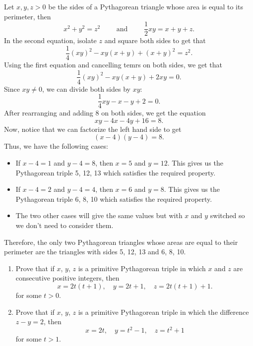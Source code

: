 \begin{solution}
    Let $x,y,z > 0$ be the sides of a Pythagorean triangle whose area is equal to its perimeter, then
    $$x^2 + y^2 = z^2 \qquad \text{ and } \qquad \frac{1}{2}xy = x + y + z.$$
    In the second equation, isolate $z$ and square both sides to get that
    $$\frac{1}{4}(xy)^2 - xy(x+y) + (x + y)^2 = z^2.$$
    Using the first equation and cancelling temrs on both sides, we get that
    $$\frac{1}{4}(xy)^2 - xy(x+y) + 2xy = 0.$$
    Since $xy \neq 0$, we can divide both sides by $xy$:
    $$\frac{1}{4}xy - x - y + 2 = 0.$$
    After rearranging and adding 8 on both sides, we get the equation
    $$xy - 4x - 4y + 16 = 8.$$
    Now, notice that we can factorize the left hand side to get
    $$(x-4)(y-4) = 8.$$
    Thus, we have the following cases:
    \begin{itemize}
        \item If $x-4 = 1$ and $y -4 = 8$, then $x = 5$ and $y = 12$. This gives us the Pythagorean triple 5, 12, 13 which satisfies the required property.
        \item If $x-4 = 2$ and $y - 4 = 4$, then $x = 6$ and $y = 8$. This gives us the Pythagorean triple 6, 8, 10 which satisfies the required property.
        \item The two other cases will give the same values but with $x$ and $y$ switched so we don't need to consider them.
    \end{itemize}
    Therefore, the only two Pythagorean triangles whose areas are equal to their perimeter are the triangles with sides 5, 12, 13 and 6, 8, 10. \\
\end{solution}

\begin{exercise}
    \begin{enumerate}
        \item Prove that if $x$, $y$, $z$ is a primitive Pythagorean triple in which $x$ and $z$ are consecutive positive integers, then
        $$x = 2t(t+1), \quad y = 2t + 1, \quad z = 2t(t+1) + 1.$$
        for some $t > 0$. 
        \item Prove that if $x$, $y$, $z$ is a primitive Pythagorean triple in which the difference $z - y = 2$, then
        $$x = 2t, \quad y = t^2 - 1, \quad z = t^2 + 1$$
        for some $t > 1$. \\
    \end{enumerate}
\end{exercise}

